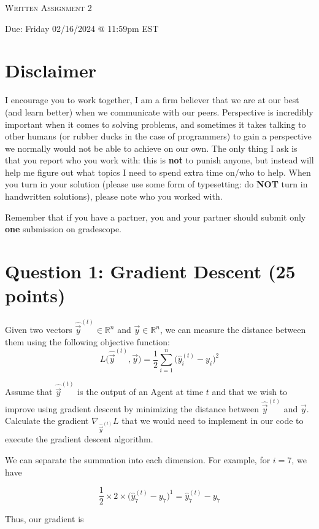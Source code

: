 \documentclass[11pt]{article}
\newcommand{\question}[1]{\section*{\normalsize #1}}
\begin{document}
\begin{center}
    {\Large \textsc{Written Assignment 2}}
\end{center}
\begin{center}
    Due: Friday 02/16/2024 @ 11:59pm EST
\end{center}

\section*{\textbf{Disclaimer}}
I encourage you to work together, I am a firm believer that we are at our best (and learn better) when we communicate with our peers. Perspective is incredibly important when it comes to solving problems, and sometimes it takes talking to other humans (or rubber ducks in the case of programmers) to gain a perspective we normally would not be able to achieve on our own. The only thing I ask is that you report who you work with: this is \textbf{not} to punish anyone, but instead will help me figure out what topics I need to spend extra time on/who to help. When you turn in your solution (please use some form of typesetting: do \textbf{NOT} turn in handwritten solutions), please note who you worked with.\newline

\noindent Remember that if you have a partner, you and your partner should submit only \textbf{one} submission on gradescope.



\question{Question 1: Gradient Descent (25 points)}
Given two vectors $\hat{\vec{y}}^{(t)}\in \mathbb{R}^{n}$ and $\vec{y}\in \mathbb{R}^{n}$, we can measure the distance between them using the following objective function:
$$L\Big(\hat{\vec{y}}^{(t)}, \vec{y}\Big) = \frac{1}{2}\sum\limits_{i=1}^n \Big(\hat{y}_i^{(t)} - y_i\Big)^2$$

\noindent Assume that $\hat{\vec{y}}^{(t)}$ is the output of an Agent at time $t$ and that we wish to improve using gradient descent by minimizing the distance between $\hat{\vec{y}}^{(t)}$ and $\vec{y}$. Calculate the gradient $\nabla_{\hat{\vec{y}}^{(t)}} L$ that we would need to implement in our code to execute the gradient descent algorithm.

\bigskip
We can separate the summation into each dimension. For example, for $i=7$, we have

\[\frac{1}{2} \times 2 \times \Big(\hat{y}_7^{(t)} - y_7\Big)^1 = \hat{y}_7^{(t)} - y_7\]

Thus, our gradient is
\end{document}
